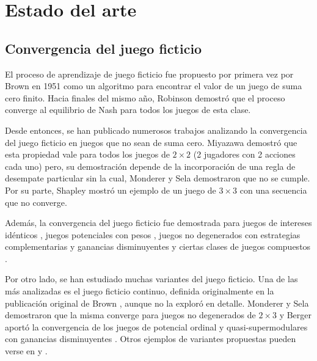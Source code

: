 \chapter{Estado del arte}  \label{cap:relwork}

\section{Convergencia del juego ficticio}

El proceso de aprendizaje de juego ficticio fue propuesto por primera vez por Brown en 1951 \cite{brown:1951} como un algoritmo para encontrar el valor de un juego de suma cero finito. Hacia finales del mismo año, Robinson \cite{robinson:zerosum} demostró que el proceso converge al equilibrio de Nash para todos los juegos de esta clase.

Desde entonces, se han publicado numerosos trabajos analizando la convergencia del juego ficticio en juegos que no sean de suma cero. Miyazawa \cite{miyazawa:2x2} demostró que esta propiedad vale para todos los juegos de $2 \times 2$ (2 jugadores con 2 acciones cada uno) pero, su demostración depende de la incorporación de una regla de desempate particular sin la cual, Monderer y Sela \cite{2x2:without} demostraron que no se cumple. Por su parte, Shapley \cite{shapley:3x3} mostró un ejemplo de un juego de $3 \times 3$ con una secuencia que no converge.

Además, la convergencia del juego ficticio fue demostrada para juegos de intereses idénticos \cite{identical:interests}, juegos potenciales con pesos \cite{weighted:potential}, juegos no degenerados con estrategias complementarias y ganancias disminuyentes \cite{strategic:complementarities} y ciertas clases de juegos compuestos \cite{compound}.

Por otro lado, se han estudiado muchas variantes del juego ficticio. Una de las más analizadas es el juego ficticio continuo, definida originalmente en la publicación original de Brown \cite{brown:1951}, aunque no la exploró en detalle. Monderer y Sela demostraron que la misma converge para juegos no degenerados de $2 \times 3$ \cite{no:cycling} y Berger aportó la convergencia de los juegos de potencial ordinal y quasi-supermodulares con ganancias disminuyentes \cite{berger:two}. Otros ejemplos de variantes propuestas pueden verse en \cite{pattern:recog} y \cite{new:kind:fp}.

